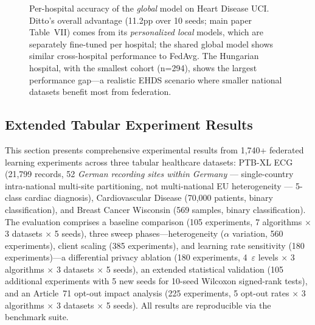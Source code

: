 \documentclass[conference]{IEEEtran}
\begin{document}
\begin{figure}[htbp]
\centering
{}
\caption{Per-hospital accuracy of the \textit{global} model on Heart Disease UCI. Ditto's overall advantage (11.2pp over 10 seeds; main paper Table~VII) comes from its \textit{personalized local} models, which are separately fine-tuned per hospital; the shared global model shows similar cross-hospital performance to FedAvg. The Hungarian hospital, with the smallest cohort (n=294), shows the largest performance gap---a realistic EHDS scenario where smaller national datasets benefit most from federation.}
\label{fig:per_hospital}
\end{figure}


\subsection{Extended Tabular Experiment Results}
\label{sec:extended_tabular}

This section presents comprehensive experimental results from 1,740+ federated learning experiments across three tabular healthcare datasets: PTB-XL ECG (21,799 records, 52 \emph{German recording sites within Germany} --- single-country intra-national multi-site partitioning, not multi-national EU heterogeneity --- 5-class cardiac diagnosis), Cardiovascular Disease (70,000 patients, binary classification), and Breast Cancer Wisconsin (569 samples, binary classification). The evaluation comprises a baseline comparison (105 experiments, 7 algorithms $\times$ 3 datasets $\times$ 5 seeds), three sweep phases---heterogeneity ($\alpha$ variation, 560 experiments), client scaling (385 experiments), and learning rate sensitivity (180 experiments)---a differential privacy ablation (180 experiments, 4~$\varepsilon$ levels $\times$ 3 algorithms $\times$ 3 datasets $\times$ 5 seeds), an extended statistical validation (105 additional experiments with 5 new seeds for 10-seed Wilcoxon signed-rank tests), and an Article~71 opt-out impact analysis (225 experiments, 5 opt-out rates $\times$ 3 algorithms $\times$ 3 datasets $\times$ 5 seeds). All results are reproducible via the benchmark suite.
\end{document}
